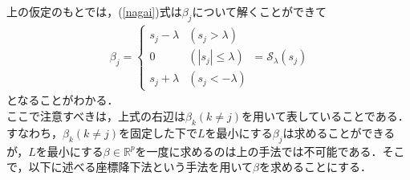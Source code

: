 \documentclass{jsarticle}
\theoremstyle{definition}
\theoremstyle{mystyle} %
\begin{document}
上の仮定のもとでは，(\ref{nagai})式は$\beta_j$について解くことができて
\begin{align}
\label{bii}
\beta_j = \begin{cases}
s_j -\lambda&(s_j>\lambda)\\
0 &(|s_j|\leq \lambda)\\
s_j+\lambda & (s_j<-\lambda)
\end{cases}=\mathcal{S}_{\lambda}(s_j)
\end{align}
となることがわかる．\\

ここで注意すべきは，上式の右辺は$\beta_k(k\neq j)$を用いて表していることである．すなわち，$\beta_k(k\neq j)$を固定した下で$L$を最小にする$\beta_j$は求めることができるが，$L$を最小にする$\beta\in\mathbb{R}^p$を一度に求めるのは上の手法では不可能である．そこで，以下に述べる座標降下法という手法を用いて$\beta$を求めることにする．
\end{document}
